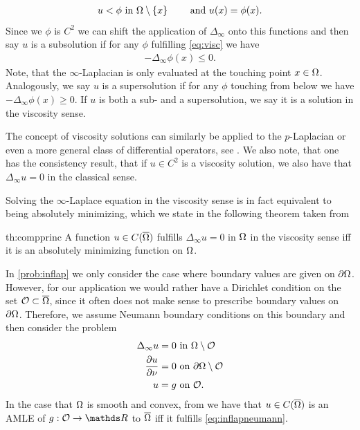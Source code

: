 %
\begin{align}\label{eq:visc}
u < \phi \text{ in } \Omega\setminus\{x\}\qquad\text{ and } u(x) = \phi(x).
\end{align}
%
Since we $\phi$ is $C^2$ we can shift the application of $\Delta_\infty$ onto this functions and then say $u$ is a subsolution if for any $\phi$ fulfilling \cref{eq:visc} we have
%
\begin{align*}
- \Delta_\infty \phi(x) \leq 0.
\end{align*}
%
Note, that the $\infty$-Laplacian is only evaluated at the touching point $x\in\Omega$. Analogously, we say $u$ is a supersolution if for any $\phi$ touching from below we have $- \Delta_\infty \phi(x) \geq 0$. If $u$ is both a sub- and a supersolution, we say it is a solution in the viscosity sense. 
%
\begin{remark}{}{}
The concept of viscosity solutions can similarly be applied to the $p$-Laplacian or even a more general class of differential operators, see \cite{lindqvist2017notes}. We also note, that one has the consistency result, that if $u\in C^2$ is a viscosity solution, we also have that $\Delta_\infty u = 0$ in the classical sense. 
\end{remark}
%
%
\noindent%
Solving the $\infty$-Laplace equation in the viscosity sense is in fact equivalent to being absolutely minimizing, which we state in the following theorem taken from \cite{aronsson2004tour}
%
\begin{theorem}{\cite[Theorem 4.13]{aronsson2004tour}}{th:compprinc}
A function $u\in C(\overline{\Omega})$ fulfills $\Delta_\infty u=0$ in $\Omega$ in the viscosity sense iff it is an absolutely minimizing function on $\Omega$.
\end{theorem}
%
%
\noindent
In \cref{prob:inflap} we only consider the case where boundary values are given on $\partial\Omega$. However, for our application we would rather have a Dirichlet condition on the set $\mathcal{O}\subset\overline{\Omega}$, since it often does not make sense to prescribe boundary values on $\partial\Omega$. Therefore, we assume Neumann boundary conditions on this boundary and then consider the problem
%
\begin{align}\label{eq:inflapneumann}
\begin{aligned}
\Delta_\infty u = 0 &\text{ in }\Omega\setminus\mathcal{O}\\
\frac{\partial u}{\partial \nu} = 0 &\text{ on }\partial\Omega\setminus\mathcal{O}\\
u = g &\text{ on }\mathcal{O}.
\end{aligned}
\end{align}
%
In the case that $\Omega$ is smooth and convex, from \cite[Lem. 3.1]{armstrong2011infinity} we have that $u\in C(\overline{\Omega})$ is an AMLE of $g:\conset\to\R$ to $\overline{\Omega}$ iff it fulfills \cref{eq:inflapneumann}.\par

